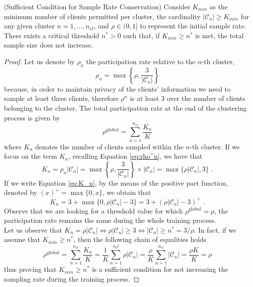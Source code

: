 \begin{theorem}{(Sufficient Condition for Sample Rate Conservation)}\label{thm:samplerate} Consider $K_{min}$ as the minimum number of clients permitted per cluster, \ie the cardinality $|\mathcal{C}_n| \geq K_{min}$ for any given cluster $n = 1,\dots, n_{cl}$, and $\rho \in (0,1]$ to represent the initial sample rate. There exists a critical threshold $n^* > 0$ such that, if $K_{min} \geq n^*$ is met, the total sample size does not increase.
\end{theorem}
\begin{proof}
Let us denote by $\rho_n$ the participation rate relative to the $n$-th cluster, \ie
\begin{equation}\label{eq:rho^n}
    \rho_n = \max \left\{\rho, \dfrac{3}{|\mathcal{C}_n|}\right\}
\end{equation}
because, in order to maintain privacy of the clients' information we need to sample at least three clients, therefore $\rho^n$ is at least $3$ over the number of clients belonging to the cluster. The total participation rate at the end of the clustering process is given by
\begin{equation}
    \rho^{\text{global}} = \sum_{n = 1}^{n_{cl}} \dfrac{K_n}{K}
\end{equation}
where $K_n$ denotes the number of clients sampled within the $n$-th cluster. If we focus on the term $K_n$, recalling Equation \ref{eq:rho^n}, we have that
\begin{equation}\label{eq:K_n}
    K_n = \rho_n |\mathcal{C}_n| = \max \left\{\rho, \dfrac{3}{|\mathcal{C}_n|}\right\}\times|\mathcal{C}_n| = \max\{\rho |\mathcal{C}_n|, 3\}\,\,.
\end{equation}
If we write Equation \ref{eq:K_n}, by the means of the positive part function, denoted by $(x)^+ = \max\{0,x\}$, we obtain that
\begin{equation}
    K_n = 3 + \max\{0, \rho |\mathcal{C}_n| - 3\} = 3 + (\rho |\mathcal{C}_n| - 3)^+\,\,.
\end{equation}
Observe that we are looking for a threshold value for which $\rho^{\text{global}} = \rho$, \ie the participation rate remains the same during the whole training process.\\
Let us observe that $K_n = \rho |\mathcal{C}_n| \iff \rho |\mathcal{C}_n| \geq 3 \iff |\mathcal{C}_n| \geq n^* = 3/\rho$. In fact, if we assume that $K_{min} \geq n^*$, then the following chain of equalities holds
\begin{equation*}
    \rho^{\text{global}} = \sum_{n = 1}^{n_{cl}} \dfrac{K_n}{K} = \dfrac{1}{K} \sum_{n = 1}^{n_cl} \rho|\mathcal{C}_{n}| = \dfrac{\rho}{K} \sum_{n = 1}^{n_{cl}}|\mathcal{C}_n| = \dfrac{\rho K}{K} = \rho
\end{equation*}
thus proving that $K_{min} \geq n^*$ is a sufficient condition for not increasing the sampling rate during the training process.
\end{proof}
